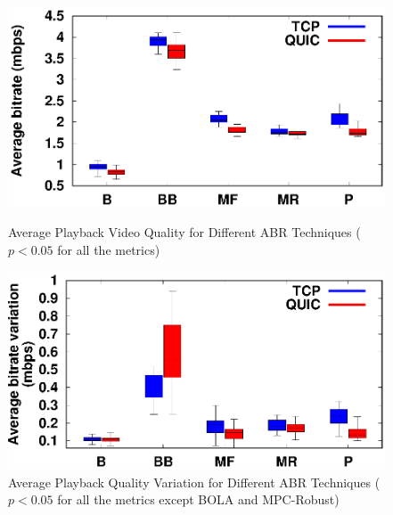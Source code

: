 \begin{figure}[!t]
	\begin{minipage}[t]{0.48\linewidth}
		\includegraphics[width=\linewidth]{img/newexp/bitrate_box}
		\caption{\label{fig:chap03s2:averageQuality_n}Average Playback Video Quality for Different ABR Techniques ($p<0.05$ for all the metrics)}
	\end{minipage}\hfill
	\begin{minipage}[t]{0.48\linewidth}
		\includegraphics[width=\linewidth]{img/newexp/smooth_box}
		\caption{\label{fig:chap03s2:averageQualityVariation_n}Average Playback Quality Variation for Different \acs{ABR} Techniques ($p<0.05$ for all the metrics except BOLA and MPC-Robust)}
	\end{minipage}


\end{figure}
